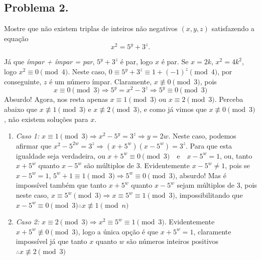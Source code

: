 \documentclass[12pt]{article}
\begin{document}
    \subsection{Problema 2.}
      \begin{tcolorbox}[problembox={Enunciado do problema}]
        Mostre que não existem triplas de inteiros não negativos $(x, y, z)$
        satisfazendo a equação
        \[
          x^2 = 5^y + 3^z.
        \]
      \end{tcolorbox}
      Já que \textit{ímpar + ímpar = par}, $5^y + 3^z$ é par, logo $x$ é par. 
      Se $x = 2k$, $x^2 = 4k^2$, logo $x^2 \equiv 0 \pmod{4}$. Neste caso,
      $0 \equiv 5^y + 3^z \equiv 1 + (-1)^z \pmod{4}$, por conseguinte, $z$ é um número
      ímpar. Claramente, $x \not\equiv 0 \pmod{3}$, pois
      \[
        x \equiv 0 \pmod{3} \Rightarrow 5^y = x^2 - 3^z \Rightarrow 5^y \equiv 0 \pmod{3}
      \]
      Absurdo! Agora, nos resta apenas $x \equiv 1 \pmod{3}$ ou $x \equiv 2 \pmod{3}$. Perceba abaixo
      que $x \not\equiv 1 \pmod{3}$ e $x \not\equiv 2 \pmod{3}$, e como já vimos que
      $x \not\equiv 0 \pmod{3}$, não existem soluções para $x$.
      \begin{enumerate}
        \item \textit{Caso 1:} $x \equiv 1 \pmod{3} \Rightarrow x^2 - 5^y = 3^z \Rightarrow y = 2w$. Neste caso, podemos afirmar
          que $x^2 - 5^{2w} = 3^z \Rightarrow (x + 5^w)(x - 5^w) = 3^z$. Para que esta igualdade
          seja verdadeira, ou $x + 5^w \equiv 0 \pmod{3} \quad \text{e} \quad x - 5^w = 1$, ou, tanto
          $x + 5^w$ quanto $x - 5^w$ são múltiplos de 3. Evidentemente $x - 5^w \neq 1$,
          pois se $x - 5^w = 1$, $5^w + 1 \equiv 1 \pmod{3} \Rightarrow 5^w \equiv 0 \pmod{3}$, absurdo!
          Mas é impossível também que tanto $x + 5^w$ quanto $x - 5^w$ sejam múltiplos de 3, pois neste caso,
          $x \equiv 5^w \pmod{3} \Rightarrow  x \equiv 5^w \equiv 1 \pmod{3}$, impossibilitando que
          $x - 5^w \equiv 0 \pmod{3} \therefore x \not\equiv 1 \pmod{n}$

        \item \textit{Caso 2:} $x \equiv 2 \pmod{3} \Rightarrow x^2 \equiv 5^w \equiv 1 \pmod{3}$.
          Evidentemente $x + 5^w \not\equiv 0 \pmod{3}$, logo a única opção é que $x + 5^w = 1$, claramente impossível já
          que tanto $x$ quanto $w$ são números inteiros positivos $\therefore x \not\equiv 2 \pmod{3}$
  \end{enumerate}

    \clearpage
\end{document}
